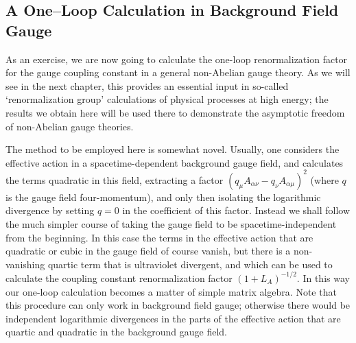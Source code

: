 \subsection{A One--Loop Calculation in Background Field Gauge}

As an exercise, we are now going to calculate the one-loop renormalization
factor for the gauge coupling constant in a general non-Abelian gauge
theory. As we will see in the next chapter, this provides an essential input
in so-called `renormalization group' calculations of physical processes at
high energy; the results we obtain here will be used there to demonstrate
the asymptotic freedom of non-Abelian gauge theories.

The method to be employed here is somewhat novel. Usually, one
considers the effective action in a spacetime-dependent background gauge
field, and calculates the terms quadratic in this field, extracting a factor
$(q_\mu A_{\alpha\nu}-q_\nu A_{\alpha\mu})^2$ (where $q$ is the gauge field
four-momentum), and only then isolating the logarithmic divergence by setting
$q=0$ in the coefficient of this factor. Instead we shall follow the much
simpler course of taking the gauge field to be spacetime-independent from the
beginning. In this case the terms in the effective action that are quadratic
or cubic in the gauge field of course vanish, but there is a non-vanishing
quartic term that is ultraviolet divergent, and which can be used to calculate
the coupling constant renormalization factor $(1+L_A)^{-1/2}$. In this way our
one-loop calculation becomes a matter of simple matrix algebra. Note that
this procedure can only work in background field gauge; otherwise there
would be independent logarithmic divergences in the parts of the effective
action that are quartic and quadratic in the background gauge field.

